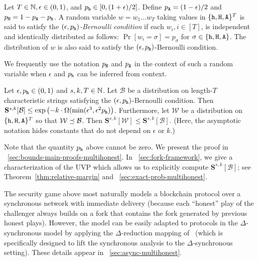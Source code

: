   \begin{definition}\label{def:bernoulli-cond}
    Let $T \in \mathbb{N}, \epsilon \in (0,1)$, and
    $p_{\mathtt{h}} \in [0,(1+\epsilon)/2]$. Define $p_{\mathtt{A}} = (1-\epsilon)/2$ and
    $p_{\mathtt{H}} = 1- p_{\mathtt{A}} - p_{\mathtt{h}}$.  A random variable $w = w_1 \ldots w_T$
    taking values in $\{\mathtt{h}, \mathtt{H}, \mathtt{A}\}^T$ is said to satisfy the
    \emph{$(\epsilon, p_{\mathtt{h}})$-Bernoulli condition} if each
    $w_i, i \in [T]$, is independent and identically distributed as
    follows: $\Pr[w_i = \sigma] = p_\sigma$ for
    $\sigma \in \{\mathtt{h}, \mathtt{H}, \mathtt{A}\}$.  The distribution of $w$ is also said
    to satisfy the $(\epsilon, p_{\mathtt{h}})$-Bernoulli condition.

    We frequently use the notation $p_{\mathtt{H}}$ and $p_{\mathtt{A}}$ in the context of
    such a random variable when $\epsilon$ and $p_{\mathtt{h}}$ can be inferred
    from context.
  \end{definition}
  
  \begin{theorem}\label{thm:main-mh}
    Let $\epsilon, p_{\mathtt{h}} \in (0, 1)$ and $s, k, T \in \mathbb{N}$.  
    Let $\mathcal{B}$ be a distribution 
    on length-$T$ characteristic strings satisfying 
    the $(\epsilon, p_{\mathtt{h}})$-Bernoulli condition.
    Then 
    $
      \mathbf{S}^{s,k}[\mathcal{B}] 
        \leq 
        \exp\left(-k\cdot \Omega( 
          \min(\epsilon^3, \epsilon^2 p_{\mathtt{h}}) 
        \right)
    $.
    Furthermore, 
    let 
    $\mathcal{W}$ be a distribution on
    $\{\mathtt{h}, \mathtt{H}, \mathtt{A}\}^T$ so that 
    $\mathcal{W} \preceq \mathcal{B}$. 
    Then $\mathbf{S}^{s,k}[\mathcal{W}] 
        \leq \mathbf{S}^{s,k}[\mathcal{B}]$.   
    (Here, the asymptotic notation hides constants that do not depend on $\epsilon$ or $k$.)
  \end{theorem}
  Note that the quantity $p_{\mathtt{h}}$ above cannot be zero.
  We present the proof in \Section~\ref{sec:bounds-main-proofs-multihonest}. 
  In \Section~\ref{sec:fork-framework}, 
  we give a characterization of the UVP which 
  allows us to explicitly compute $\mathbf{S}^{s,k}[\mathcal{B}]$; 
  see 
  Theorem~\ref{thm:relative-margin} and 
  \Section~\ref{sec:exact-prob-multihonest}.


   The security
   game above most naturally models a blockchain protocol over a
   synchronous network with immediate delivery (because each ``honest''
   play of the challenger always builds on a fork that contains the fork
   generated by previous honest plays). However, the model can be easily
   adapted to protocols in the $\Delta$-synchronous model by applying
   the $\Delta$-reduction mapping of~\cite{Praos} (which is specifically
   designed to lift the synchronous analysis to the $\Delta$-synchronous
   setting).
   These details appear in \Section~\ref{sec:async-multihonest}.


